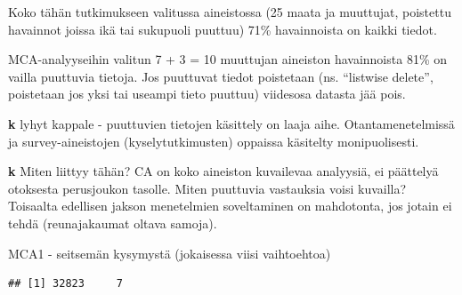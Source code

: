 \documentclass[
  finnish,
]{book}
\newenvironment{Shaded}{\begin{snugshade}}{\end{snugshade}}
\newcommand{\CommentTok}[1]{\textcolor[rgb]{0.56,0.35,0.01}{\textit{#1}}}
\begin{document}
\begin{Shaded}
\end{Shaded}

Koko tähän tutkimukseen valitussa aineistossa (25 maata ja muuttujat,
poistettu havainnot joissa ikä tai sukupuoli puuttuu) 71\% havainnoista
on kaikki tiedot.

MCA-analyyseihin valitun 7 + 3 = 10 muuttujan aineiston havainnoista
81\% on vailla puuttuvia tietoja. Jos puuttuvat tiedot poistetaan (ns.
``listwise delete'', poistetaan jos yksi tai useampi tieto puuttuu)
viidesosa datasta jää pois.

\textbf{k} lyhyt kappale - puuttuvien tietojen käsittely on laaja aihe.
Otantamenetelmissä ja survey-aineistojen (kyselytutkimusten) oppaissa
käsitelty monipuolisesti.

\textbf{k} Miten liittyy tähän? CA on koko aineiston kuvailevaa
analyysiä, ei päättelyä otoksesta perusjoukon tasolle. Miten puuttuvia
vastauksia voisi kuvailla? Toisaalta edellisen jakson menetelmien
soveltaminen on mahdotonta, jos jotain ei tehdä (reunajakaumat oltava
samoja).

MCA1 - seitsemän kysymystä (jokaisessa viisi vaihtoehtoa)

\begin{verbatim}
## [1] 32823     7
\end{verbatim}
\end{document}
